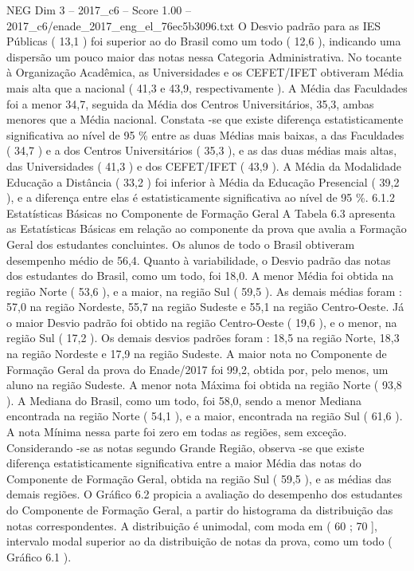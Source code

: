 \begin{textsample}{NEG Dim 3 – 2017\_c6 – Score 1.00 – 2017\_c6/enade\_2017\_eng\_el\_76ec5b3096.txt}
O Desvio padrão para as IES Públicas ( 13,1 ) foi superior ao do Brasil como um todo ( 12,6 ), indicando uma dispersão um pouco maior das notas nessa Categoria Administrativa.
No tocante à Organização Acadêmica, as Universidades e os CEFET/IFET obtiveram Média mais alta que a nacional ( 41,3 e 43,9, respectivamente ).
A Média das Faculdades foi a menor 34,7, seguida da Média dos Centros Universitários, 35,3, ambas menores que a Média nacional.
Constata -se que existe diferença estatisticamente significativa ao nível de 95 \% entre as duas Médias mais baixas, a das Faculdades ( 34,7 ) e a dos Centros Universitários ( 35,3 ), e as das duas médias mais altas, das Universidades ( 41,3 ) e dos CEFET/IFET ( 43,9 ).
A Média da Modalidade Educação a Distância ( 33,2 ) foi inferior à Média da Educação Presencial ( 39,2 ), e a diferença entre elas é estatisticamente significativa ao nível de 95 \%. 6.1.2 Estatísticas Básicas no Componente de Formação Geral A Tabela 6.3 apresenta as Estatísticas Básicas em relação ao componente da prova que avalia a Formação Geral dos estudantes concluintes.
Os alunos de todo o Brasil obtiveram desempenho médio de 56,4.
Quanto à variabilidade, o Desvio padrão das notas dos estudantes do Brasil, como um todo, foi 18,0.
A menor Média foi obtida na região Norte ( 53,6 ), e a maior, na região Sul ( 59,5 ).
As demais médias foram : 57,0 na região Nordeste, 55,7 na região Sudeste e 55,1 na região Centro-Oeste.
Já o maior Desvio padrão foi obtido na região Centro-Oeste ( 19,6 ), e o menor, na região Sul ( 17,2 ).
Os demais desvios padrões foram : 18,5 na região Norte, 18,3 na região Nordeste e 17,9 na região Sudeste.
A maior nota no Componente de Formação Geral da prova do Enade/2017 foi 99,2, obtida por, pelo menos, um aluno na região Sudeste.
A menor nota Máxima foi obtida na região Norte ( 93,8 ).
A Mediana do Brasil, como um todo, foi 58,0, sendo a menor Mediana encontrada na região Norte ( 54,1 ), e a maior, encontrada na região Sul ( 61,6 ).
A nota Mínima nessa parte foi zero em todas as regiões, sem exceção.
Considerando -se as notas segundo Grande Região, observa -se que existe diferença estatisticamente significativa entre a maior Média das notas do Componente de Formação Geral, obtida na região Sul ( 59,5 ), e as médias das demais regiões.
O Gráfico 6.2 propicia a avaliação do desempenho dos estudantes do Componente de Formação Geral, a partir do histograma da distribuição das notas correspondentes.
A distribuição é unimodal, com moda em ( 60 ; 70 ], intervalo modal superior ao da distribuição de notas da prova, como um todo ( Gráfico 6.1 ).

\end{textsample}
